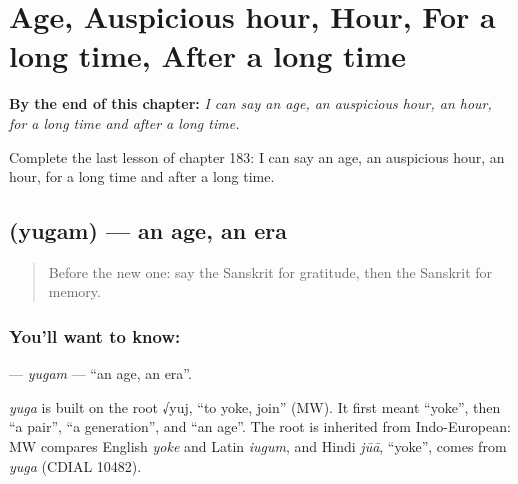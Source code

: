 
\chapter{Age, Auspicious hour, Hour, For a long time, After a long time}
\label{ch:sa-age-auspicious-hour-hour-for-a-long-time-after-a-long-time}

\begin{chapteropening}
\textbf{By the end of this chapter:} \emph{I can say an age, an auspicious hour, an hour, for a long time and after a long time.}

Complete the last lesson of chapter 183: I can say an age, an auspicious hour, an hour, for a long time and after a long time.
\end{chapteropening}

\section[\texorpdfstring{\sk{युगम्} (yugam)}{युगम् (yugam)}]{ (yugam) — an age, an era}

\label{lesson:SA-C183-yugam}



\begin{quote}
Before the new one: say the Sanskrit for gratitude, then the Sanskrit for memory.
\end{quote}

\subsection*{You'll want to know: }
\textbf{} — \emph{yugam} — \textquotedblleft{}an age, an era\textquotedblright{}.

\begin{cousinweb}
\emph{yuga} is built on the root √yuj, \textquotedblleft{}to yoke, join\textquotedblright{} (MW). It first meant \textquotedblleft{}yoke\textquotedblright{}, then \textquotedblleft{}a pair\textquotedblright{}, \textquotedblleft{}a generation\textquotedblright{}, and \textquotedblleft{}an age\textquotedblright{}. The root is inherited from Indo-European: MW compares English \emph{yoke} and Latin \emph{iugum}, and Hindi \emph{jūā}, \textquotedblleft{}yoke\textquotedblright{}, comes from \emph{yuga} (CDIAL 10482).
\end{cousinweb}

